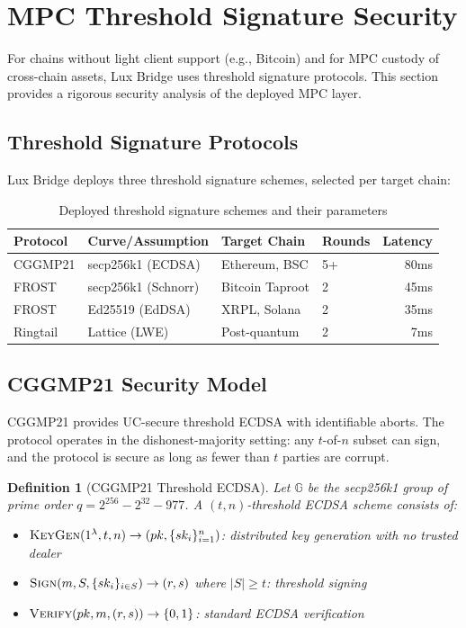 \documentclass[11pt]{article}
\newtheorem{definition}{Definition}
\begin{document}
\section{MPC Threshold Signature Security}\label{sec:mpc-security}

For chains without light client support (e.g., Bitcoin) and for MPC custody of cross-chain assets, Lux Bridge uses threshold signature protocols. This section provides a rigorous security analysis of the deployed MPC layer.

\subsection{Threshold Signature Protocols}

Lux Bridge deploys three threshold signature schemes, selected per target chain:

\begin{table}[h]
\centering
\begin{tabular}{llllr}
\toprule
\textbf{Protocol} & \textbf{Curve/Assumption} & \textbf{Target Chain} & \textbf{Rounds} & \textbf{Latency} \\
\midrule
CGGMP21 \cite{cgg21} & secp256k1 (ECDSA) & Ethereum, BSC & 5+ & 80ms \\
FROST \cite{frost} & secp256k1 (Schnorr) & Bitcoin Taproot & 2 & 45ms \\
FROST \cite{frost} & Ed25519 (EdDSA) & XRPL, Solana & 2 & 35ms \\
Ringtail \cite{ntt-ringtail} & Lattice (LWE) & Post-quantum & 2 & 7ms \\
\bottomrule
\end{tabular}
\caption{Deployed threshold signature schemes and their parameters}
\label{tab:threshold-schemes}
\end{table}

\subsection{CGGMP21 Security Model}

CGGMP21 \cite{cgg21} provides UC-secure threshold ECDSA with identifiable aborts. The protocol operates in the dishonest-majority setting: any $t$-of-$n$ subset can sign, and the protocol is secure as long as fewer than $t$ parties are corrupt.

\begin{definition}[CGGMP21 Threshold ECDSA]
Let $\mathbb{G}$ be the secp256k1 group of prime order $q = 2^{256} - 2^{32} - 977$. A $(t, n)$-threshold ECDSA scheme consists of:
\begin{itemize}
  \item $\textsc{KeyGen}(1^\lambda, t, n) \to (pk, \{sk_i\}_{i=1}^n)$: distributed key generation with no trusted dealer
  \item $\textsc{Sign}(m, S, \{sk_i\}_{i \in S}) \to (r, s)$ where $|S| \geq t$: threshold signing
  \item $\textsc{Verify}(pk, m, (r,s)) \to \{0,1\}$: standard ECDSA verification
\end{itemize}
\end{definition}
\end{document}
